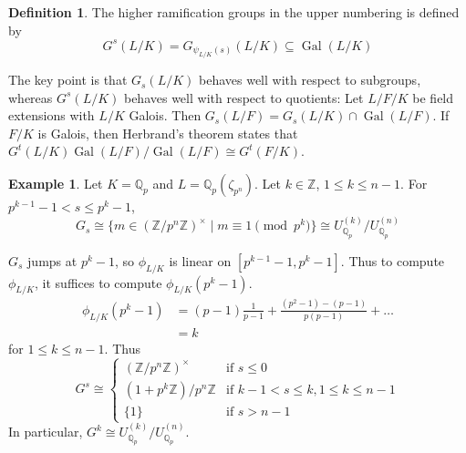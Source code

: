 \documentclass[11pt]{article}
\theoremstyle{definition}
\newtheorem{definition}{Definition}[subsection]
\newtheorem*{example}{Example}
\theoremstyle{plain}
\theoremstyle{remark}
\DeclareMathOperator{\Gal}{Gal}
\newcommand{\ZZ}{\mathbb{Z}}
\newcommand{\QQ}{\mathbb{Q}}
\begin{document}
\begin{definition}\label{def:21_1}
    The higher ramification groups in the upper numbering is defined by
    \begin{equation*}
        G^s(L/K) = G_{\psi_{L/K}(s)}(L/K) \subseteq \Gal(L/K)
    \end{equation*}
\end{definition}

The key point is that $G_s(L/K)$ behaves well with respect to subgroups, whereas $G^s(L/K)$ behaves well with respect to quotients: Let $L/F/K$ be field extensions with $L/K$ Galois. Then $G_s(L/F) = G_s(L/K) \cap \Gal(L/F)$. If $F/K$ is Galois, then Herbrand's theorem states that $G^t(L/K) \Gal(L/F) / \Gal(L/F) \cong G^t(F/K)$.

\begin{example}
    Let $K = \QQ_p$ and $L = \QQ_p(\zeta_{p^n})$. Let $k \in \ZZ$, $1 \le k \le n-1$. For $p^{k-1} - 1 < s \le p^k - 1$,
    \begin{equation*}
        G_s \cong \{m \in (\ZZ / p^n \ZZ)^\times \mid m \equiv 1 \pmod{p^k}\} \cong U_{\QQ_p}^{(k)} / U_{\QQ_p}^{(n)}
    \end{equation*}
\end{example}
$G_s$ jumps at $p^k - 1$, so $\phi_{L/K}$ is linear on $[p^{k-1} - 1, p^k - 1]$. Thus to compute $\phi_{L/K}$, it suffices to compute $\phi_{L/K}(p^k-1)$.
\begin{align*}
    \phi_{L/K}(p^k-1)
    &= (p-1) \frac{1}{p-1} + \frac{(p^2 - 1) - (p - 1)}{p(p-1)} + \ldots\\
    &= k
\end{align*}
for $1 \le k \le n-1$. Thus
\begin{equation*}
    G^s \cong
    \begin{cases}
        (\ZZ / p^n \ZZ)^\times & \text{if } s \le 0\\
        (1 + p^k \ZZ) / p^n \ZZ & \text{if } k-1 < s \le k, 1 \le k \le n - 1\\
        \{1\} & \text{if } s > n-1
    \end{cases}
\end{equation*}
In particular, $G^k \cong U_{\QQ_p}^{(k)} / U_{\QQ_p}^{(n)}$.
\end{document}
